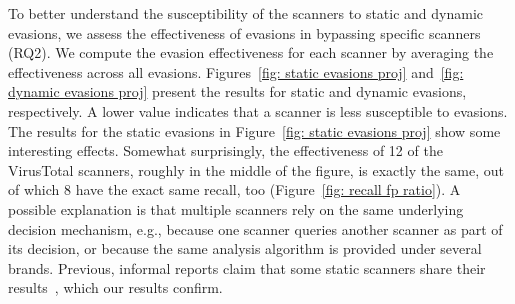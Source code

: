 To better understand the susceptibility of the scanners to static and dynamic evasions, we assess the effectiveness of evasions in bypassing specific 
scanners (RQ2).
We compute the evasion effectiveness for each 
scanner by averaging the effectiveness across all evasions.
Figures~\ref{fig: static evasions proj} and~\ref{fig: dynamic evasions proj} 
present the results for static and dynamic evasions, respectively.
A lower value indicates that a scanner is less susceptible to evasions.
The results for the static evasions in Figure~\ref{fig: static evasions 
proj} show some interesting effects.
Somewhat surprisingly, the effectiveness of 12 of the~\nbVirusTotalEngines{} VirusTotal scanners, roughly 
in the middle of the figure, is exactly the same, out of which 8 have the exact same recall, too (Figure~\ref{fig: recall fp ratio}).
A possible explanation is that multiple scanners rely on 
the same underlying decision mechanism, e.g., because one scanner queries 
another scanner as part of its decision, or because the same analysis 
algorithm is provided under several brands.
Previous, informal reports claim that some static scanners share their results~\cite{static_analyzers_share_analysis_result}, which our results 
confirm.


